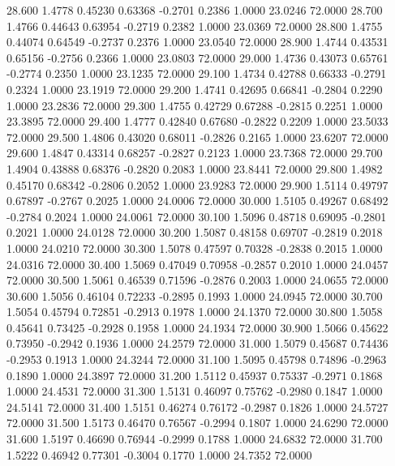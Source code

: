   28.600   1.4778   0.45230   0.63368  -0.2701   0.2386   1.0000  23.0246  72.0000
  28.700   1.4766   0.44643   0.63954  -0.2719   0.2382   1.0000  23.0369  72.0000
  28.800   1.4755   0.44074   0.64549  -0.2737   0.2376   1.0000  23.0540  72.0000
  28.900   1.4744   0.43531   0.65156  -0.2756   0.2366   1.0000  23.0803  72.0000
  29.000   1.4736   0.43073   0.65761  -0.2774   0.2350   1.0000  23.1235  72.0000
  29.100   1.4734   0.42788   0.66333  -0.2791   0.2324   1.0000  23.1919  72.0000
  29.200   1.4741   0.42695   0.66841  -0.2804   0.2290   1.0000  23.2836  72.0000
  29.300   1.4755   0.42729   0.67288  -0.2815   0.2251   1.0000  23.3895  72.0000
  29.400   1.4777   0.42840   0.67680  -0.2822   0.2209   1.0000  23.5033  72.0000
  29.500   1.4806   0.43020   0.68011  -0.2826   0.2165   1.0000  23.6207  72.0000
  29.600   1.4847   0.43314   0.68257  -0.2827   0.2123   1.0000  23.7368  72.0000
  29.700   1.4904   0.43888   0.68376  -0.2820   0.2083   1.0000  23.8441  72.0000
  29.800   1.4982   0.45170   0.68342  -0.2806   0.2052   1.0000  23.9283  72.0000
  29.900   1.5114   0.49797   0.67897  -0.2767   0.2025   1.0000  24.0006  72.0000
  30.000   1.5105   0.49267   0.68492  -0.2784   0.2024   1.0000  24.0061  72.0000
  30.100   1.5096   0.48718   0.69095  -0.2801   0.2021   1.0000  24.0128  72.0000
  30.200   1.5087   0.48158   0.69707  -0.2819   0.2018   1.0000  24.0210  72.0000
  30.300   1.5078   0.47597   0.70328  -0.2838   0.2015   1.0000  24.0316  72.0000
  30.400   1.5069   0.47049   0.70958  -0.2857   0.2010   1.0000  24.0457  72.0000
  30.500   1.5061   0.46539   0.71596  -0.2876   0.2003   1.0000  24.0655  72.0000
  30.600   1.5056   0.46104   0.72233  -0.2895   0.1993   1.0000  24.0945  72.0000
  30.700   1.5054   0.45794   0.72851  -0.2913   0.1978   1.0000  24.1370  72.0000
  30.800   1.5058   0.45641   0.73425  -0.2928   0.1958   1.0000  24.1934  72.0000
  30.900   1.5066   0.45622   0.73950  -0.2942   0.1936   1.0000  24.2579  72.0000
  31.000   1.5079   0.45687   0.74436  -0.2953   0.1913   1.0000  24.3244  72.0000
  31.100   1.5095   0.45798   0.74896  -0.2963   0.1890   1.0000  24.3897  72.0000
  31.200   1.5112   0.45937   0.75337  -0.2971   0.1868   1.0000  24.4531  72.0000
  31.300   1.5131   0.46097   0.75762  -0.2980   0.1847   1.0000  24.5141  72.0000
  31.400   1.5151   0.46274   0.76172  -0.2987   0.1826   1.0000  24.5727  72.0000
  31.500   1.5173   0.46470   0.76567  -0.2994   0.1807   1.0000  24.6290  72.0000
  31.600   1.5197   0.46690   0.76944  -0.2999   0.1788   1.0000  24.6832  72.0000
  31.700   1.5222   0.46942   0.77301  -0.3004   0.1770   1.0000  24.7352  72.0000
